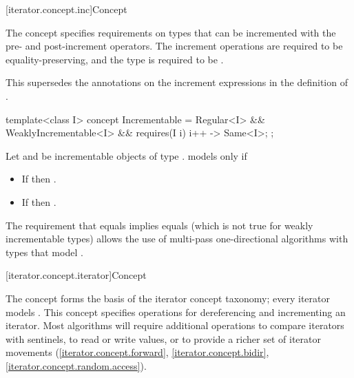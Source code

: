 [iterator.concept.inc]{Concept }

\pnum
The  concept specifies requirements on types that can be incremented with the pre-
and post-increment operators. The increment operations are required to be equality-preserving,
and the type is required to be .
\begin{note}
This supersedes the annotations on the increment expressions
in the definition of .
\end{note}

%
\begin{codeblock}
template<class I>
  concept Incrementable =
    Regular<I> &&
    WeaklyIncrementable<I> &&
    requires(I i) {
      { i++ } -> Same<I>;
    };
\end{codeblock}

\pnum
Let  and  be incrementable objects of type .
 models  only if

\begin{itemize}
\item If  then .
\item If  then .
\end{itemize}

\pnum
\begin{note}
The requirement that
 equals 
implies
 equals 
(which is not true for weakly incrementable types)
allows the use of multi-pass one-directional
algorithms with types that model .
\end{note}

[iterator.concept.iterator]{Concept }

\pnum
The  concept forms the basis
of the iterator concept taxonomy; every iterator models .
This concept specifies operations for dereferencing and incrementing
an iterator. Most algorithms will require additional operations
to compare iterators with sentinels, to
read or write values, or
to provide a richer set of iterator movements (\ref{iterator.concept.forward},
\ref{iterator.concept.bidir}, \ref{iterator.concept.random.access}).

